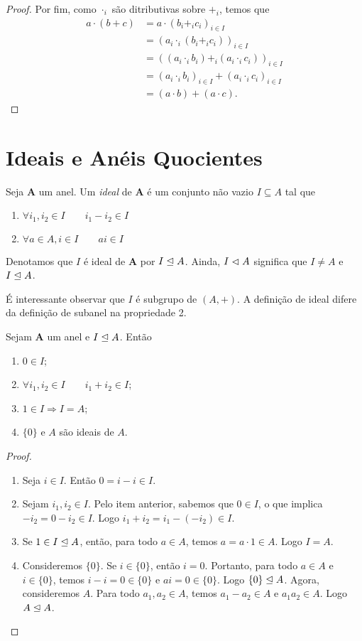 \begin{proof}
	Por fim, como $\cdot_i$ são ditributivas sobre $+_i$, temos que
	\begin{align*}
	a \cdot (b + c) &= a \cdot (b_i +_i c_i)_{i \in I} \\
		&= (a_i \cdot_i (b_i +_i c_i))_{i \in I} \\
		&= ((a_i \cdot_i b_i) +_i (a_i \cdot_i c_i))_{i \in I} \\
		&= (a_i \cdot_i b_i)_{i \in I} + (a_i \cdot_i c_i)_{i \in I} \\
		&= (a \cdot b) + (a \cdot c).
	\end{align*}
\end{proof}

\section{Ideais e Anéis Quocientes}

\begin{defi}
	Seja $\bm A$ um anel. Um \emph{ideal} de $\bm A$ é um conjunto não vazio $I \subseteq A$ tal que
	\begin{enumerate}
	\item $\forall i_1,i_2 \in I \qquad i_1 - i_2 \in I$
	\item $\forall a \in A, i \in I \qquad ai \in I$
	\end{enumerate}
Denotamos que $I$ é ideal de $\bm A$ por $I \mathrel{\unlhd} A$. Ainda, $I \mathrel{\lhd} A$ significa que $I \neq A$ e $I \mathrel{\unlhd} A$.
\end{defi}

	É interessante observar que $I$ é subgrupo de $(A,+)$. A definição de ideal difere da definição de subanel na propriedade 2.

\begin{prop}
	Sejam $\bm A$ um anel e $I \mathrel{\unlhd} A$. Então
	\begin{enumerate}
	\item $0 \in I$;
	\item $\forall i_1,i_2 \in I \qquad i_1 + i_2 \in I$;
	\item $1 \in I \Rightarrow I=A$;
	\item $\{0\}$ e $A$ são ideais de $A$.
	\end{enumerate}
\end{prop}
\begin{proof}
	\begin{enumerate}
	\item Seja $i \in I$. Então $0 = i-i \in I$.
	\item Sejam $i_1,i_2 \in I$. Pelo item anterior, sabemos que $0 \in I$, o que implica $-i_2 = 0 - i_2 \in I$. Logo $i_1 + i_2 = i_1 - (-i_2) \in I$.
	\item Se $1 \in I \mathrel{\unlhd} A$, então, para todo $a \in A$, temos $a=a\cdot1 \in A$. Logo $I=A$.
	\item Consideremos $\{0\}$. Se $i \in \{0\}$, então $i=0$. Portanto, para todo $a \in A$ e $i \in \{0\}$, temos $i-i=0 \in \{0\}$ e $ai=0 \in \{0\}$. Logo $\{0\} \mathrel{\unlhd} A$. Agora, consideremos $A$. Para todo $a_1,a_2 \in A$, temos $a_1-a_2 \in A$ e $a_1a_2 \in A$. Logo $A \mathrel{\unlhd} A$.
	\end{enumerate}
\end{proof}

